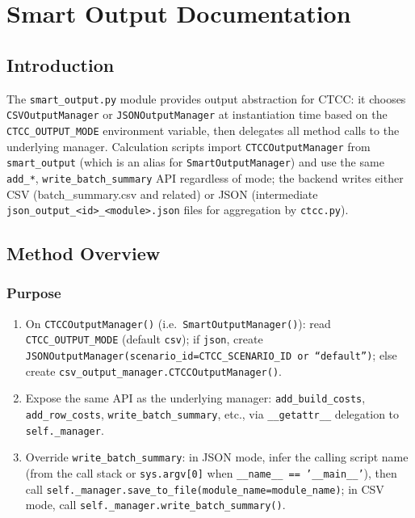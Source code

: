 \documentclass[ctcc_full_documentation.tex]{subfiles}
\begin{document}
\chapter{Smart Output Documentation}

\section{Introduction}

The \texttt{smart\_output.py} module provides output abstraction for CTCC: it chooses \texttt{CSVOutputManager} or \texttt{JSONOutputManager} at instantiation time based on the \texttt{CTCC\_OUTPUT\_MODE} environment variable, then delegates all method calls to the underlying manager. Calculation scripts import \texttt{CTCCOutputManager} from \texttt{smart\_output} (which is an alias for \texttt{SmartOutputManager}) and use the same \texttt{add\_*}, \texttt{write\_batch\_summary} API regardless of mode; the backend writes either CSV (batch\_summary.csv and related) or JSON (intermediate \texttt{json\_output\_<id>\_<module>.json} files for aggregation by \texttt{ctcc.py}).

\section{Method Overview}

\subsection{Purpose}

\begin{enumerate}
    \item On \texttt{CTCCOutputManager()} (i.e.\ \texttt{SmartOutputManager()}): read \texttt{CTCC\_OUTPUT\_MODE} (default \texttt{csv}); if \texttt{json}, create \texttt{JSONOutputManager(scenario\_id=CTCC\_SCENARIO\_ID or ``default'')}; else create \texttt{csv\_output\_manager.CTCCOutputManager()}.
    \item Expose the same API as the underlying manager: \texttt{add\_build\_costs}, \texttt{add\_row\_costs}, \texttt{write\_batch\_summary}, etc., via \texttt{\_\_getattr\_\_} delegation to \texttt{self.\_manager}.
    \item Override \texttt{write\_batch\_summary}: in JSON mode, infer the calling script name (from the call stack or \texttt{sys.argv[0]} when \texttt{\_\_name\_\_ == '\_\_main\_\_'}), then call \texttt{self.\_manager.save\_to\_file(module\_name=module\_name)}; in CSV mode, call \texttt{self.\_manager.write\_batch\_summary()}.
\end{enumerate}
\end{document}

